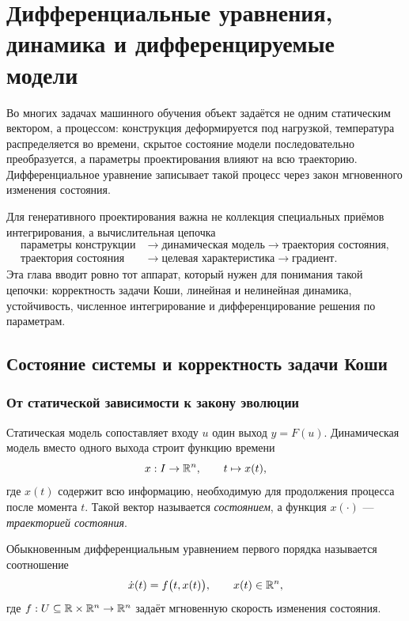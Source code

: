 \chapter{Дифференциальные уравнения, динамика и дифференцируемые модели}
\label{chap:dynamics-differentiable-models}

Во многих задачах машинного обучения объект задаётся не одним статическим вектором, а процессом: конструкция деформируется под нагрузкой, температура распределяется во времени, скрытое состояние модели последовательно преобразуется, а параметры проектирования влияют на всю траекторию. Дифференциальное уравнение записывает такой процесс через закон мгновенного изменения состояния.

Для генеративного проектирования важна не коллекция специальных приёмов интегрирования, а вычислительная цепочка
\[
\begin{aligned}
\text{параметры конструкции}
&\longrightarrow
\text{динамическая модель}
\longrightarrow
\text{траектория состояния},\\
\text{траектория состояния}
&\longrightarrow
\text{целевая характеристика}
\longrightarrow
\text{градиент}.
\end{aligned}
\]
Эта глава вводит ровно тот аппарат, который нужен для понимания такой цепочки: корректность задачи Коши, линейная и нелинейная динамика, устойчивость, численное интегрирование и дифференцирование решения по параметрам.

\section{Состояние системы и корректность задачи Коши}
\label{sec:state-and-well-posed-ivp}

\subsection{От статической зависимости к закону эволюции}

Статическая модель сопоставляет входу $u$ один выход $y=F(u)$. Динамическая модель вместо одного выхода строит функцию времени
\[
x:I\to\mathbb{R}^n,
\qquad
 t\mapsto x(t),
\]
где $x(t)$ содержит всю информацию, необходимую для продолжения процесса после момента $t$. Такой вектор называется \emph{состоянием}, а функция $x(\cdot)$ --- \emph{траекторией состояния}.

\begin{definition}
Обыкновенным дифференциальным уравнением первого порядка называется соотношение
\begin{equation}
\label{eq:general-first-order-ode}
\dot x(t)=f\bigl(t,x(t)\bigr),
\qquad
x(t)\in\mathbb{R}^n,
\end{equation}
где $f:U\subseteq\mathbb{R}\times\mathbb{R}^n\to\mathbb{R}^n$ задаёт мгновенную скорость изменения состояния.
\end{definition}


